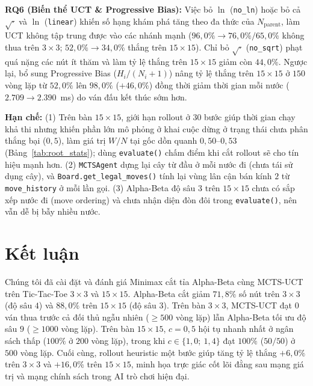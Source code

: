 \documentclass[conference]{IEEEtran}
\begin{document}
\textbf{RQ6 (Biến thể UCT \& Progressive Bias):} Việc bỏ $\ln$ (\texttt{no\_ln}) hoặc bỏ cả $\sqrt{\cdot}$ và $\ln$ (\texttt{linear}) khiến số hạng khám phá tăng theo đa thức của $N_{\mathrm{parent}}$, làm UCT không tập trung được vào các nhánh mạnh ($96{,}0\% \rightarrow 76{,}0\% / 65{,}0\%$ không thua trên $3\times 3$; $52{,}0\% \rightarrow 34{,}0\%$ thắng trên $15\times 15$). Chỉ bỏ $\sqrt{\cdot}$ (\texttt{no\_sqrt}) phạt quá nặng các nút ít thăm và làm tỷ lệ thắng trên $15\times 15$ giảm còn $44{,}0\%$. Ngược lại, bổ sung Progressive Bias ($H_i/(N_i+1)$) nâng tỷ lệ thắng trên $15\times 15$ ở $150$ vòng lặp từ $52{,}0\%$ lên $98{,}0\%$ ($+46{,}0\%$) đồng thời giảm thời gian mỗi nước ($2.709 \rightarrow 2.390$~ms) do ván đấu kết thúc sớm hơn.

\textbf{Hạn chế:} (1) Trên bàn $15\times 15$, giới hạn rollout ở $30$ bước giúp thời gian chạy khả thi nhưng khiến phần lớn mô phỏng ở khai cuộc dừng ở trạng thái chưa phân thắng bại ($0{,}5$), làm giá trị $W/N$ tại gốc dồn quanh $0{,}50$--$0{,}53$ (Bảng~\ref{tab:root_stats}); dùng \texttt{evaluate()} chấm điểm khi cắt rollout sẽ cho tín hiệu mạnh hơn. (2) \texttt{MCTSAgent} dựng lại cây từ đầu ở mỗi nước đi (chưa tái sử dụng cây), và \texttt{Board.get\_legal\_moves()} tính lại vùng lân cận bán kính $2$ từ \texttt{move\_history} ở mỗi lần gọi. (3) Alpha-Beta độ sâu $3$ trên $15\times 15$ chưa có sắp xếp nước đi (move ordering) và chưa nhận diện đòn đôi trong \texttt{evaluate()}, nên vẫn dễ bị bẫy nhiều nước.

\section{Kết luận}
Chúng tôi đã cài đặt và đánh giá Minimax cắt tỉa Alpha-Beta cùng MCTS-UCT trên Tic-Tac-Toe $3\times 3$ và $15\times 15$. Alpha-Beta cắt giảm $71{,}8\%$ số nút trên $3\times 3$ (độ sâu $4$) và $88{,}0\%$ trên $15\times 15$ (độ sâu $3$). Trên bàn $3\times 3$, MCTS-UCT đạt $0$ ván thua trước cả đối thủ ngẫu nhiên ($\ge 500$ vòng lặp) lẫn Alpha-Beta tối ưu độ sâu $9$ ($\ge 1000$ vòng lặp). Trên bàn $15\times 15$, $c = 0{,}5$ hội tụ nhanh nhất ở ngân sách thấp ($100\%$ ở $200$ vòng lặp), trong khi $c \in \{1{,}0;\ 1{,}4\}$ đạt $100\%$ ($50/50$) ở $500$ vòng lặp. Cuối cùng, rollout heuristic một bước giúp tăng tỷ lệ thắng $+6{,}0\%$ trên $3\times 3$ và $+16{,}0\%$ trên $15\times 15$, minh họa trực giác cốt lõi đằng sau mạng giá trị và mạng chính sách trong AI trò chơi hiện đại.
\end{document}
